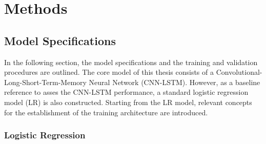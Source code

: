\documentclass[a4paper,11pt]{article}
\begin{document}
\newpage

\hypertarget{methods}{%
\section{Methods}\label{methods}}

\setcounter{page}{27}

\hypertarget{model-specifications}{%
\subsection{Model Specifications}\label{model-specifications}}

In the following section, the model specifications and the training and
validation procedures are outlined. The core model of this thesis consists
of a Convolutional-Long-Short-Term-Memory Neural Network (CNN-LSTM). However,
as a baseline reference to asses the CNN-LSTM performance, a standard logistic
regression model (LR) is also constructed. Starting from the LR model, relevant
concepts for the establishment of the training architecture are introduced.

\hypertarget{logistic-regression}{%
\subsubsection{Logistic Regression}\label{logistic-regression}}
\end{document}
